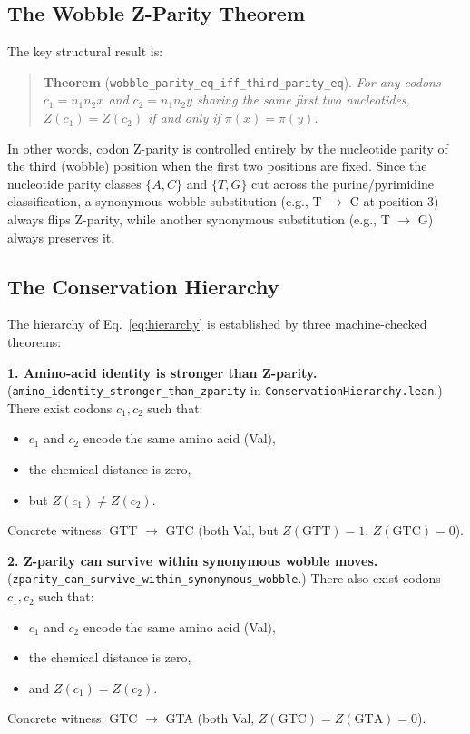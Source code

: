 \documentclass[11pt,twocolumn]{article}
\begin{document}
\subsection{The Wobble Z-Parity Theorem}

The key structural result is:

\begin{quote}
\textbf{Theorem} (\texttt{wobble\_parity\_eq\_iff\_third\_parity\_eq}).
\textit{For any codons $c_1 = n_1 n_2 x$ and $c_2 = n_1 n_2 y$ sharing
the same first two nucleotides, $Z(c_1) = Z(c_2)$ if and only if
$\pi(x) = \pi(y)$.}
\end{quote}

In other words, codon Z-parity is controlled entirely by the nucleotide
parity of the third (wobble) position when the first two positions are
fixed. Since the nucleotide parity classes $\{A, C\}$ and $\{T, G\}$
cut across the purine/pyrimidine classification, a synonymous wobble
substitution (e.g., T $\to$ C at position 3) always flips Z-parity, while
another synonymous substitution (e.g., T $\to$ G) always preserves it.

\subsection{The Conservation Hierarchy}

The hierarchy of Eq.~\eqref{eq:hierarchy} is established by three
machine-checked theorems:

\textbf{1. Amino-acid identity is stronger than Z-parity.}
(\texttt{amino\_identity\_stronger\_than\_zparity} in
\texttt{ConservationHierarchy.lean}.)
There exist codons $c_1, c_2$ such that:
\begin{itemize}
\item $c_1$ and $c_2$ encode the same amino acid (Val),
\item the chemical distance is zero,
\item but $Z(c_1) \neq Z(c_2)$.
\end{itemize}
Concrete witness: GTT $\to$ GTC (both Val, but $Z(\text{GTT}) = 1$,
$Z(\text{GTC}) = 0$).

\textbf{2. Z-parity can survive within synonymous wobble moves.}
(\texttt{zparity\_can\_survive\_within\_synonymous\_wobble}.)
There also exist codons $c_1, c_2$ such that:
\begin{itemize}
\item $c_1$ and $c_2$ encode the same amino acid (Val),
\item the chemical distance is zero,
\item and $Z(c_1) = Z(c_2)$.
\end{itemize}
Concrete witness: GTC $\to$ GTA (both Val, $Z(\text{GTC}) = Z(\text{GTA}) = 0$).
\end{document}

